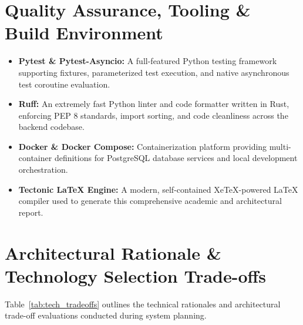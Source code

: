 \documentclass[11pt,a4paper,oneside]{report}
\begin{document}
\section{Quality Assurance, Tooling \& Build Environment}
\label{sec:tech_qa}
\begin{itemize}
    \item \textbf{Pytest \& Pytest-Asyncio:} A full-featured Python testing framework supporting fixtures, parameterized test execution, and native asynchronous test coroutine evaluation.
    \item \textbf{Ruff:} An extremely fast Python linter and code formatter written in Rust, enforcing PEP 8 standards, import sorting, and code cleanliness across the backend codebase.
    \item \textbf{Docker \& Docker Compose:} Containerization platform providing multi-container definitions for PostgreSQL database services and local development orchestration.
    \item \textbf{Tectonic LaTeX Engine:} A modern, self-contained XeTeX-powered LaTeX compiler used to generate this comprehensive academic and architectural report.
\end{itemize}

\section{Architectural Rationale \& Technology Selection Trade-offs}
\label{sec:tech_tradeoffs}
Table~\ref{tab:tech_tradeoffs} outlines the technical rationales and architectural trade-off evaluations conducted during system planning.
\end{document}
